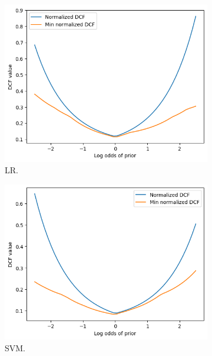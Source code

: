 \documentclass{article}
\begin{document}
\begin{figure}[ht]
    \centering
    \begin{subfigure}[b]{0.3\textwidth}
        \centering
        \includegraphics[width=\textwidth]{images/lr_bayes_error.png}
        \caption{LR.}
    \end{subfigure}
    \hfill
    \begin{subfigure}[b]{0.3\textwidth}
        \centering
        \includegraphics[width=\textwidth]{images/svm_bayes_error.png}
        \caption{SVM.}
    \end{subfigure}
    \hfill
    \begin{subfigure}[b]{0.3\textwidth}
        \centering

\end{subfigure}
\end{figure}
\end{document}
